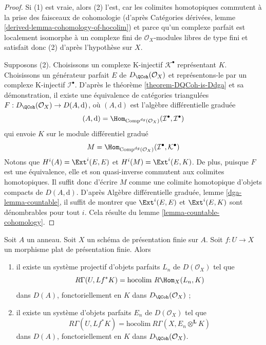 \begin{proof}
Si (1) est vraie, alors (2) l'est, car les colimites homotopiques commutent
à la prise des faisceaux de cohomologie
(d'après Catégories dérivées, lemme \ref{derived-lemma-cohomology-of-hocolim})
et parce qu'un complexe parfait est
localement isomorphe à un complexe fini de $\mathcal{O}_X$-modules libres de type fini
et satisfait donc (2) d'après l'hypothèse sur $X$.

\medskip\noindent
Supposons (2).
Choisissons un complexe K-injectif $\mathcal{K}^\bullet$ représentant $K$.
Choisissons un générateur parfait $E$ de $D_\QCoh(\mathcal{O}_X)$ et
représentons-le par un complexe K-injectif $\mathcal{I}^\bullet$.
D'après le théorème \ref{theorem-DQCoh-is-Ddga}
et sa démonstration, il existe une équivalence
de catégories triangulées $F : D_\QCoh(\mathcal{O}_X) \to D(A, \text{d})$,
où $(A, \text{d})$ est l'algèbre différentielle graduée
$$
(A, \text{d}) =
\Hom_{\text{Comp}^{dg}(\mathcal{O}_X)}
(\mathcal{I}^\bullet, \mathcal{I}^\bullet)
$$
qui envoie $K$ sur le module différentiel gradué
$$
M = \Hom_{\text{Comp}^{dg}(\mathcal{O}_X)}
(\mathcal{I}^\bullet, \mathcal{K}^\bullet)
$$
Notons que $H^i(A) = \Ext^i(E, E)$ et
$H^i(M) = \Ext^i(E, K)$.
De plus, puisque $F$ est une équivalence, elle et son quasi-inverse commutent
aux colimites homotopiques.
Il suffit donc d'écrire $M$ comme une colimite homotopique
d'objets compacts de $D(A, \text{d})$.
D'après Algèbre différentielle graduée, lemme \ref{dga-lemma-countable},
il suffit de montrer que $\Ext^i(E, E)$ et
$\Ext^i(E, K)$ sont dénombrables pour tout $i$.
Cela résulte du lemme \ref{lemma-countable-cohomology}.
\end{proof}

\begin{lemma}
\label{lemma-computing-sections-as-colim}
Soit $A$ un anneau. Soit $X$ un schéma de présentation finie sur $A$.
Soit $f : U \to X$ un morphisme plat de présentation finie. Alors
\begin{enumerate}
\item il existe un système projectif d'objets parfaits $L_n$ de
$D(\mathcal{O}_X)$ tel que
$$
R\Gamma(U, Lf^*K) = \text{hocolim}\ R\Hom_X(L_n, K)
$$
dans $D(A)$, fonctoriellement en $K$ dans $D_\QCoh(\mathcal{O}_X)$ ;
\item il existe un système d'objets parfaits $E_n$ de
$D(\mathcal{O}_X)$ tel que
$$
R\Gamma(U, Lf^*K) = \text{hocolim}\ R\Gamma(X, E_n \otimes^\mathbf{L} K)
$$
dans $D(A)$, fonctoriellement en $K$ dans $D_\QCoh(\mathcal{O}_X)$.
\end{enumerate}
\end{lemma}

